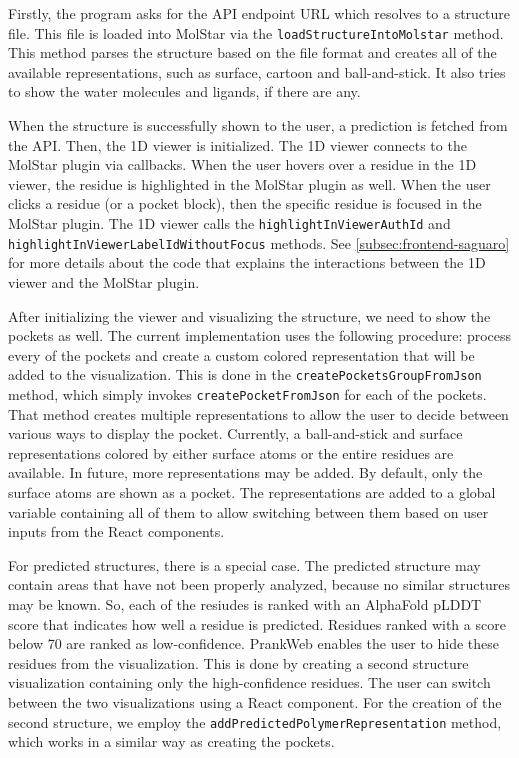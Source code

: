 Firstly, the program asks for the API endpoint URL which resolves to a structure file. This file is loaded into MolStar via the \texttt{loadStructureIntoMolstar} method. This method parses the structure based on the file format and creates all of the available representations, such as surface, cartoon and ball-and-stick. It also tries to show the water molecules and ligands, if there are any.

When the structure is successfully shown to the user, a prediction is fetched from the API. Then, the 1D viewer is initialized. The 1D viewer connects to the MolStar plugin via callbacks. When the user hovers over a residue in the 1D viewer, the residue is highlighted in the MolStar plugin as well. When the user clicks a residue (or a pocket block), then the specific residue is focused in the MolStar plugin. The 1D viewer calls the \texttt{highlightInViewerAuthId} and \texttt{highlightInViewerLabelIdWithoutFocus} methods. See \cref{subsec:frontend-saguaro} for more details about the code that explains the interactions between the 1D viewer and the MolStar plugin.

After initializing the viewer and visualizing the structure, we need to show the pockets as well. The current implementation uses the following procedure: process every of the pockets and create a custom colored representation that will be added to the visualization. This is done in the \texttt{createPocketsGroupFromJson} method, which simply invokes \texttt{createPocketFromJson} for each of the pockets. That method creates multiple representations to allow the user to decide between various ways to display the pocket. Currently, a ball-and-stick and surface representations colored by either surface atoms or the entire residues are available. In future, more representations may be added. By default, only the surface atoms are shown as a pocket. The representations are added to a global variable containing all of them to allow switching between them based on user inputs from the React components.

For predicted structures, there is a special case. The predicted structure may contain areas that have not been properly analyzed, because no similar structures may be known. So, each of the resiudes is ranked with an AlphaFold pLDDT score that indicates how well a residue is predicted. Residues ranked with a score below 70 are ranked as low-confidence. \cite{jumper2021highly} PrankWeb enables the user to hide these residues from the visualization. This is done by creating a second structure visualization containing only the high-confidence residues. The user can switch between the two visualizations using a React component. For the creation of the second structure, we employ the \texttt{addPredictedPolymerRepresentation} method, which works in a similar way as creating the pockets.

